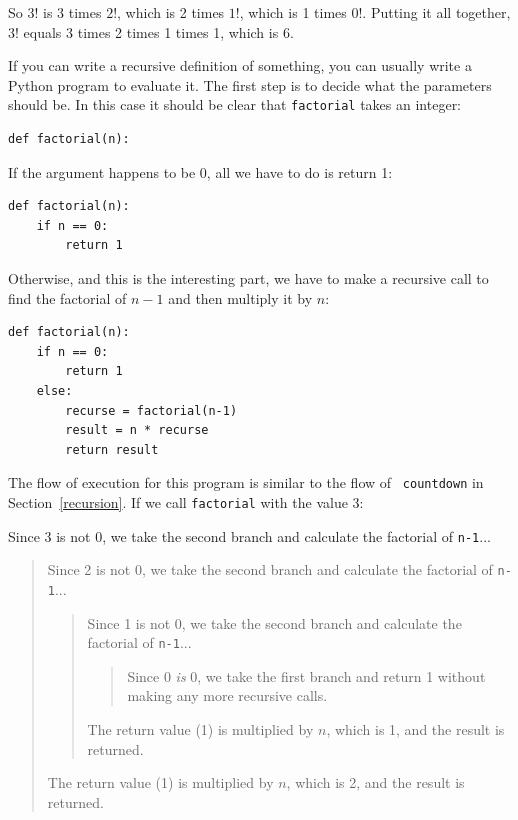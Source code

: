 \documentclass[10pt]{book}
\begin{document}
So $3!$ is 3 times $2!$, which is 2 times $1!$, which is 1 times
$0!$. Putting it all together, $3!$ equals 3 times 2 times 1 times 1,
which is 6.


If you can write a recursive definition of something, you can usually
write a Python program to evaluate it. The first step is to decide
what the parameters should be.  In this case it should be clear
that {\tt factorial} takes an integer:

\beforeverb
\begin{verbatim}
def factorial(n):
\end{verbatim}
\afterverb
%
If the argument happens to be 0, all we have to do is return 1:

\beforeverb
\begin{verbatim}
def factorial(n):
    if n == 0:
        return 1
\end{verbatim}
\afterverb
%
Otherwise, and this is the interesting part, we have to make a
recursive call to find the factorial of $n-1$ and then multiply it by
$n$:

\beforeverb
\begin{verbatim}
def factorial(n):
    if n == 0:
        return 1
    else:
        recurse = factorial(n-1)
        result = n * recurse
        return result
\end{verbatim}
\afterverb
%
The flow of execution for this program is similar to the flow of {\tt
countdown} in Section~\ref{recursion}.  If we call {\tt factorial}
with the value 3:

Since 3 is not 0, we take the second branch and calculate the factorial
of {\tt n-1}...

\begin{quote}
Since 2 is not 0, we take the second branch and calculate the factorial of
{\tt n-1}...


  \begin{quote}
  Since 1 is not 0, we take the second branch and calculate the factorial
  of {\tt n-1}...


    \begin{quote}
    Since 0 {\em is} 0, we take the first branch and return 1
    without making any more recursive calls.
    \end{quote}


  The return value (1) is multiplied by $n$, which is 1, and the
  result is returned.
  \end{quote}


The return value (1) is multiplied by $n$, which is 2, and the
result is returned.
\end{quote}
\end{document}
